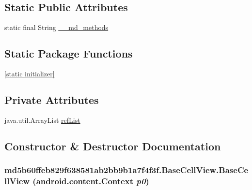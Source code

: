 \subsection*{Static Public Attributes}
\begin{CompactItemize}
\item 
static final String \hyperlink{classmd5b60ffeb829f638581ab2bb9b1a7f4f3f_1_1_base_cell_view_b45ff8d3fd40dd0e56aafff804b441ea}{\_\-\_\-md\_\-methods}
\end{CompactItemize}
\subsection*{Static Package Functions}
\begin{CompactItemize}
\item 
\hyperlink{classmd5b60ffeb829f638581ab2bb9b1a7f4f3f_1_1_base_cell_view_f945c6cd310f27f3f6ed7c0198a20d8c}{\mbox{[}static initializer\mbox{]}}
\end{CompactItemize}
\subsection*{Private Attributes}
\begin{CompactItemize}
\item 
java.util.ArrayList \hyperlink{classmd5b60ffeb829f638581ab2bb9b1a7f4f3f_1_1_base_cell_view_da428ae06aa11eb73b64b1723a81985b}{refList}
\end{CompactItemize}


\subsection{Constructor \& Destructor Documentation}
\hypertarget{classmd5b60ffeb829f638581ab2bb9b1a7f4f3f_1_1_base_cell_view_7bbdf44f1151ae9c2fbf5be34398aba5}{
\subsubsection[{BaseCellView}]{\setlength{\rightskip}{0pt plus 5cm}md5b60ffeb829f638581ab2bb9b1a7f4f3f.BaseCellView.BaseCellView (android.content.Context {\em p0})}}
\label{classmd5b60ffeb829f638581ab2bb9b1a7f4f3f_1_1_base_cell_view_7bbdf44f1151ae9c2fbf5be34398aba5}


